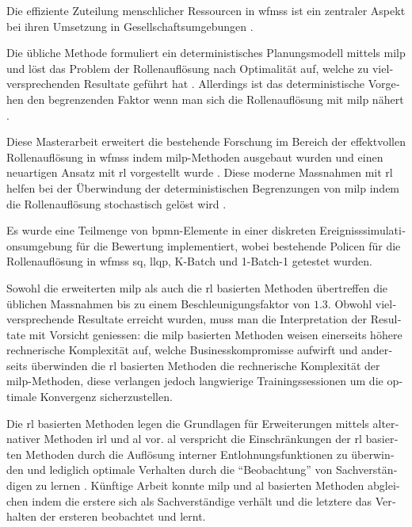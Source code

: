 \begin{otherlanguage}{ngerman}
	\begin{zusammenfassung}
	Die effiziente Zuteilung menschlicher Ressourcen in \glspl{wfms} ist ein zentraler Aspekt bei ihren Umsetzung in Gesellschaftsumgebungen \citep{Cheng2000,Mentzas2001}.

	Die übliche Methode formuliert ein deterministisches Planungsmodell mittels \gls{milp} und löst das Problem der Rollenauflösung nach Optimalität auf, welche zu vielversprechenden Resultate geführt hat \citep{Zeng2005}. Allerdings ist das deterministische Vorgehen den begrenzenden Faktor wenn man sich die Rollenauflösung mit \gls{milp} nähert \citep{Zeng2005}.

	Diese Masterarbeit erweitert die bestehende Forschung im Bereich der effektvollen Rollenauflösung in \glspl{wfms} indem \gls{milp}-Methoden ausgebaut wurden und einen neuartigen Ansatz mit \gls{rl} vorgestellt wurde \citep{Sutton2017}. Diese moderne Massnahmen mit \gls{rl} helfen bei der Überwindung der deterministischen Begrenzungen von \gls{milp} indem die Rollenauflösung stochastisch gelöst wird \citep{Sutton2017}.

	Es wurde eine Teilmenge von \gls{bpmn}-Elemente in einer diskreten Ereignisssimulationsumgebung für die Bewertung implementiert, wobei bestehende Policen für die Rollenauflösung in \glspl{wfms} \zbg \gls{sq}, \gls{llqp}, K-Batch und 1-Batch-1 getestet wurden.

	Sowohl die erweiterten \gls{milp} als auch die \gls{rl} basierten Methoden übertreffen die üblichen Massnahmen bis zu einem Beschleunigungsfaktor von $1.3$. Obwohl vielversprechende Resultate erreicht wurden, muss man die Interpretation der Resultate mit Vorsicht geniessen: die \gls{milp} basierten Methoden weisen einerseits höhere rechnerische Komplexität auf, welche Businesskompromisse aufwirft und anderseits überwinden die \gls{rl} basierten Methoden die rechnerische Komplexität der \gls{milp}-Methoden, diese verlangen jedoch langwierige Trainingssessionen um die optimale Konvergenz sicherzustellen.

	Die \gls{rl} basierten Methoden legen die Grundlagen für Erweiterungen mittels alternativer Methoden \zbg \gls{irl} \citep{Ng2000} und \gls{al} \citep{Abbeel2004} vor. \gls{al} verspricht die Einschränkungen der \gls{rl} basierten Methoden durch die Auflösung interner Entlohnungsfunktionen zu überwinden und lediglich optimale Verhalten durch die ``Beobachtung'' von Sachverständigen zu lernen \citep{Abbeel2004}. Künftige Arbeit konnte \gls{milp} und \gls{al} basierten Methoden abgleichen indem die erstere sich als Sachverständige verhält und die letztere das Verhalten der ersteren beobachtet und lernt.
	\end{zusammenfassung}
\end{otherlanguage}